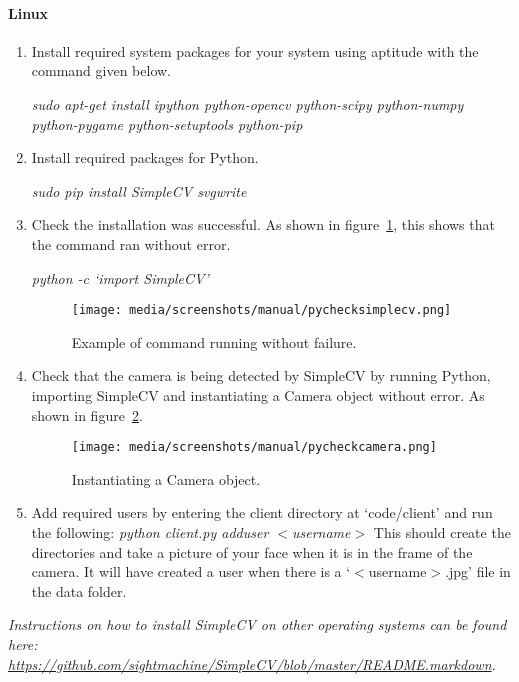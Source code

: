 \documentclass[12pt,a4paper]{report}
\begin{document}
        \paragraph{Linux}
        \begin{enumerate}
            \item Install required system packages for your system using aptitude with the command given below.

            \textit{sudo apt-get install ipython python-opencv python-scipy python-numpy python-pygame python-setuptools python-pip}

            \item Install required packages for Python.

            \textit{sudo pip install SimpleCV svgwrite}

            \item Check the installation was successful. As shown in figure~\ref{fig:simplecvcheck}, this shows that the command ran
            without error.

            \textit{python -c `import SimpleCV'}
            \begin{figure}[H]
                \centering
                \caption{Example of command running without failure.}
                \label{fig:simplecvcheck}
                    \texttt{[image: media/screenshots/manual/pychecksimplecv.png]}
            \end{figure}

            \item Check that the camera is being detected by SimpleCV by running Python, importing SimpleCV and instantiating a 
            Camera object without error. As shown in figure~\ref{fig:cameracheck}.

            \begin{figure}[H]
                \centering
                \caption{Instantiating a Camera object.}
                \label{fig:cameracheck}
                    \texttt{[image: media/screenshots/manual/pycheckcamera.png]}
            \end{figure}

            \item Add required users by entering the client directory at `code/client' and run the following: \newline
            \textit{python client.py adduser $<$username$>$} \newline
            This should create the directories and take a picture of your face when it is in the frame of the camera. It will have
            created a user when there is a `$<$username$>$.jpg' file in the data folder.

        \end{enumerate}
        \textit{Instructions on how to install SimpleCV on other operating systems can be found here: \url{https://github.com/sightmachine/SimpleCV/blob/master/README.markdown}.}
\end{document}
